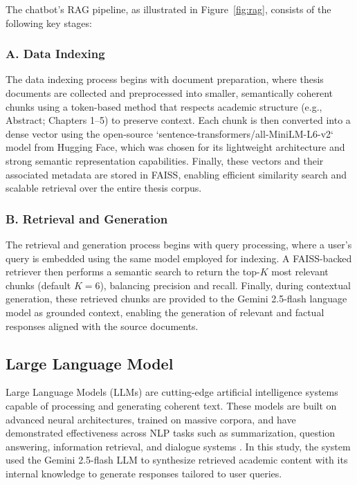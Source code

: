 \begin{refsection}
The chatbot’s RAG pipeline, as illustrated in Figure~\ref{fig:rag}, consists of the following key stages:

\subsubsection{A. Data Indexing}

The data indexing process begins with document preparation, where thesis documents are collected and preprocessed into smaller, semantically coherent chunks using a token-based method that respects academic structure (e.g., Abstract; Chapters 1–5) to preserve context. Each chunk is then converted into a dense vector using the open-source `sentence-transformers/all-MiniLM-L6-v2` model from Hugging Face, which was chosen for its lightweight architecture and strong semantic representation capabilities. Finally, these vectors and their associated metadata are stored in FAISS, enabling efficient similarity search and scalable retrieval over the entire thesis corpus.

\subsubsection{B. Retrieval and Generation}

The retrieval and generation process begins with query processing, where a user's query is embedded using the same model employed for indexing. A FAISS-backed retriever then performs a semantic search to return the top-$K$ most relevant chunks (default $K=6$), balancing precision and recall. Finally, during contextual generation, these retrieved chunks are provided to the Gemini 2.5-flash language model as grounded context, enabling the generation of relevant and factual responses aligned with the source documents.

\subsection{Large Language Model}

Large Language Models (LLMs) are cutting-edge artificial intelligence systems capable of processing and generating coherent text. These models are built on advanced neural architectures, trained on massive corpora, and have demonstrated effectiveness across NLP tasks such as summarization, question answering, information retrieval, and dialogue systems \citeauthor{naveed2024} \citeyear{naveed2024}. In this study, the system used the Gemini 2.5-flash LLM to synthesize retrieved academic content with its internal knowledge to generate responses tailored to user queries.


\end{refsection}
